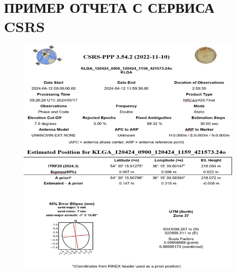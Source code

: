 \chapter{ПРИМЕР ОТЧЕТА С СЕРВИСА CSRS}\label{app:A}


\begin{figure}[ht]
	\centering
	\includegraphics[width=\linewidth]{images/picA01}
\end{figure}

